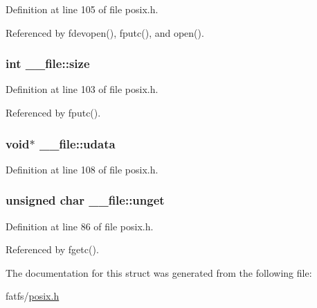 Definition at line 105 of file posix.\-h.



Referenced by fdevopen(), fputc(), and open().

\hypertarget{struct____file_aff4a1ca8b6a12460812928afae81248d}{
\subsubsection[{size}]{\setlength{\rightskip}{0pt plus 5cm}int \-\_\-\-\_\-file\-::size}}\label{struct____file_aff4a1ca8b6a12460812928afae81248d}


Definition at line 103 of file posix.\-h.



Referenced by fputc().

\hypertarget{struct____file_abe6f3bdb4df4119277132eb3e13a4628}{
\subsubsection[{udata}]{\setlength{\rightskip}{0pt plus 5cm}void$\ast$ \-\_\-\-\_\-file\-::udata}}\label{struct____file_abe6f3bdb4df4119277132eb3e13a4628}


Definition at line 108 of file posix.\-h.

\hypertarget{struct____file_a1d139ae3cb11a1fada469a49f7d3d3b6}{
\subsubsection[{unget}]{\setlength{\rightskip}{0pt plus 5cm}unsigned char \-\_\-\-\_\-file\-::unget}}\label{struct____file_a1d139ae3cb11a1fada469a49f7d3d3b6}


Definition at line 86 of file posix.\-h.



Referenced by fgetc().



The documentation for this struct was generated from the following file\-:\begin{DoxyCompactItemize}
\item 
fatfs/\hyperlink{posix_8h}{posix.\-h}\end{DoxyCompactItemize}
